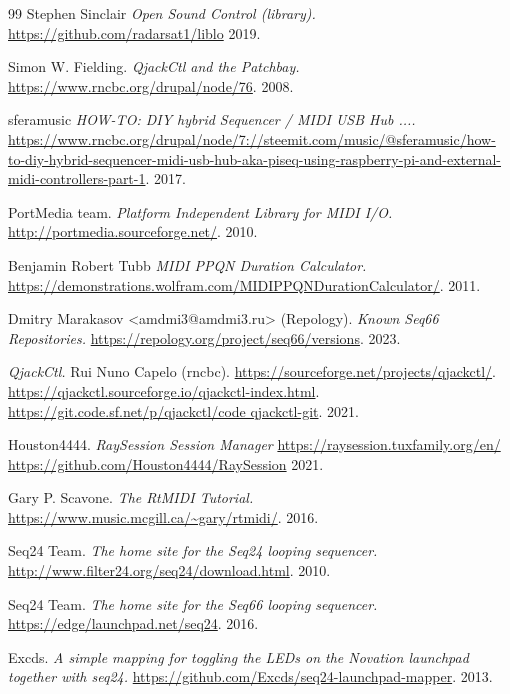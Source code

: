 {\begin{thebibliography}{99}
   Stephen Sinclair
   \emph{Open Sound Control (library).}
   \url{https://github.com/radarsat1/liblo}
   2019.

   Simon W. Fielding.
   \emph{QjackCtl and the Patchbay.}
   \url{https://www.rncbc.org/drupal/node/76}.
   2008.

   sferamusic
   \emph{HOW-TO: DIY hybrid Sequencer / MIDI USB Hub ....}
   \url{https://www.rncbc.org/drupal/node/7://steemit.com/music/@sferamusic/how-to-diy-hybrid-sequencer-midi-usb-hub-aka-piseq-using-raspberry-pi-and-external-midi-controllers-part-1}.
   2017.

   PortMedia team.
   \emph{Platform Independent Library for MIDI I/O.}
   \url{http://portmedia.sourceforge.net/}.
   2010.

   Benjamin Robert Tubb
   \emph{MIDI PPQN Duration Calculator.}
   \url{https://demonstrations.wolfram.com/MIDIPPQNDurationCalculator/}.
   2011.

   Dmitry Marakasov <amdmi3@amdmi3.ru> (Repology).
   \emph{Known Seq66 Repositories.}
   \url{https://repology.org/project/seq66/versions}.
   2023.

   \emph{QjackCtl.}
   Rui Nuno Capelo (rncbc).
   \url{https://sourceforge.net/projects/qjackctl/}.
   \url{https://qjackctl.sourceforge.io/qjackctl-index.html}.
   \url{https://git.code.sf.net/p/qjackctl/code qjackctl-git}.
   2021.

   Houston4444.
   \emph{RaySession Session Manager}
   \url{https://raysession.tuxfamily.org/en/}
   \url{https://github.com/Houston4444/RaySession}
   2021.

   Gary P. Scavone.
   \emph{The RtMIDI Tutorial.}
   \url{https://www.music.mcgill.ca/~gary/rtmidi/}.
   2016.

   Seq24 Team.
   \emph{The home site for the Seq24 looping sequencer.}
   \url{http://www.filter24.org/seq24/download.html}.
   2010.

   Seq24 Team.
   \emph{The home site for the Seq66 looping sequencer.}
   \url{https://edge/launchpad.net/seq24}.
   2016.

   Excds.
   \emph{A simple mapping for toggling the LEDs on the Novation launchpad
   together with seq24.}
   \url{https://github.com/Excds/seq24-launchpad-mapper}.
   2013.


\end{thebibliography}}

